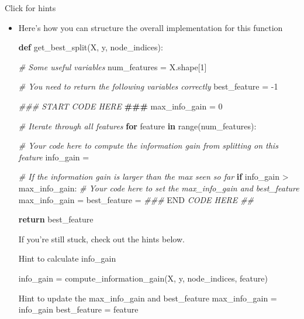 \documentclass[11pt]{article}
\newenvironment{Shaded}{}{}
\newcommand{\KeywordTok}[1]{\textcolor[rgb]{0.00,0.44,0.13}{\textbf{{#1}}}}
\newcommand{\DecValTok}[1]{\textcolor[rgb]{0.25,0.63,0.44}{{#1}}}
\newcommand{\CommentTok}[1]{\textcolor[rgb]{0.38,0.63,0.69}{\textit{{#1}}}}
\newcommand{\AlertTok}[1]{\textcolor[rgb]{1.00,0.00,0.00}{\textbf{{#1}}}}
\newcommand{\RegionMarkerTok}[1]{{#1}}
\newcommand{\NormalTok}[1]{{#1}}
\newcommand{\ControlFlowTok}[1]{\textcolor[rgb]{0.00,0.44,0.13}{\textbf{{#1}}}}
\newcommand{\OperatorTok}[1]{\textcolor[rgb]{0.40,0.40,0.40}{{#1}}}
\newcommand{\BuiltInTok}[1]{{#1}}
\begin{document}
    Click for hints

\begin{itemize}
\item
  Here's how you can structure the overall implementation for this
  function

\begin{Shaded}
\begin{Highlighting}[]
\KeywordTok{def}\NormalTok{ get\_best\_split(X, y, node\_indices):   }

    \CommentTok{\# Some useful variables}
\NormalTok{    num\_features }\OperatorTok{=}\NormalTok{ X.shape[}\DecValTok{1}\NormalTok{]}

    \CommentTok{\# You need to return the following variables correctly}
\NormalTok{    best\_feature }\OperatorTok{=} \OperatorTok{{-}}\DecValTok{1}

    \CommentTok{\#\#\# START CODE HERE }\AlertTok{\#\#\#}
\NormalTok{    max\_info\_gain }\OperatorTok{=} \DecValTok{0}

    \CommentTok{\# Iterate through all features}
    \ControlFlowTok{for}\NormalTok{ feature }\KeywordTok{in} \BuiltInTok{range}\NormalTok{(num\_features): }

        \CommentTok{\# Your code here to compute the information gain from splitting on this feature}
\NormalTok{        info\_gain }\OperatorTok{=} 

        \CommentTok{\# If the information gain is larger than the max seen so far}
        \ControlFlowTok{if}\NormalTok{ info\_gain }\OperatorTok{\textgreater{}}\NormalTok{ max\_info\_gain:  }
            \CommentTok{\# Your code here to set the max\_info\_gain and best\_feature}
\NormalTok{            max\_info\_gain }\OperatorTok{=} 
\NormalTok{            best\_feature }\OperatorTok{=} 
    \CommentTok{\#\#\# }\RegionMarkerTok{END}\CommentTok{ CODE HERE \#\#    }

\ControlFlowTok{return}\NormalTok{ best\_feature}
\end{Highlighting}
\end{Shaded}

  If you're still stuck, check out the hints below.

  Hint to calculate info\_gain

  info\_gain = compute\_information\_gain(X, y, node\_indices, feature)

  Hint to update the max\_info\_gain and best\_feature max\_info\_gain =
  info\_gain best\_feature = feature
\end{itemize}
\end{document}
